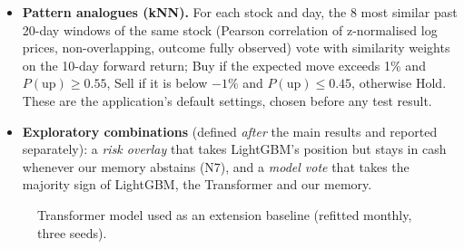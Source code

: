 \begin{itemize}
  \item \textbf{Pattern analogues (kNN).} For each stock and day, the 8 most similar past 20-day windows of the same stock (Pearson correlation of z-normalised log prices, non-overlapping, outcome fully observed) vote with similarity weights on the 10-day forward return; Buy if the expected move exceeds 1\% and $P(\text{up})\ge0.55$, Sell if it is below $-1\%$ and $P(\text{up})\le0.45$, otherwise Hold. These are the application's default settings, chosen before any test result.
  \item \textbf{Exploratory combinations} (defined \emph{after} the main results and reported separately): a \emph{risk overlay} that takes LightGBM's position but stays in cash whenever our memory abstains (N7), and a \emph{model vote} that takes the majority sign of LightGBM, the Transformer and our memory.
\end{itemize}

\begin{figure}[H]
\centering
{}
\caption{Transformer model used as an extension baseline (refitted monthly, three seeds).}
\label{fig:transformer-arch}
\end{figure}

